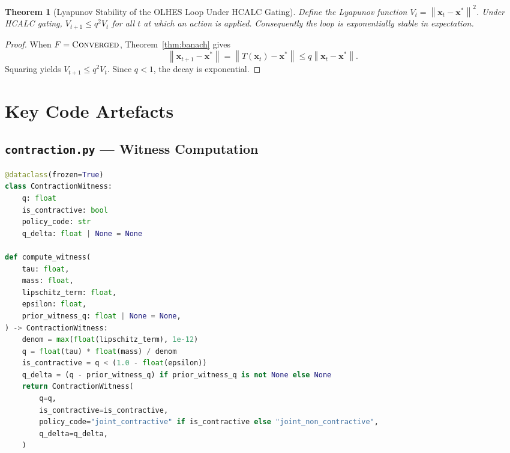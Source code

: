 \documentclass[11pt,a4paper]{article}
\theoremstyle{tealstyle}
\newtheorem{theorem}{Theorem}[section]
\theoremstyle{definition}
\newcommand{\norm}[1]{\left\lVert #1 \right\rVert}
\newcommand{\qwit}{q}
\newcommand{\F}{F}
\newcommand{\converged}{\textsc{Converged}}
\begin{document}
\begin{theorem}[Lyapunov Stability of the OLHES Loop Under HCALC Gating]
\label{thm:lyapunov}
Define the Lyapunov function $V_t = \norm{\bm{x}_t - \bm{x}^*}^2$.
Under HCALC gating, $V_{t+1} \le \qwit^2 V_t$ for all $t$ at which an
action is applied.
Consequently the loop is exponentially stable in expectation.
\end{theorem}

\begin{proof}
When $\F = \converged$, Theorem~\ref{thm:banach} gives
\[
\norm{\bm{x}_{t+1} - \bm{x}^*}
 = \norm{T(\bm{x}_t) - \bm{x}^*}
 \le \qwit \norm{\bm{x}_t - \bm{x}^*}.
\]
Squaring yields $V_{t+1} \le \qwit^2 V_t$.
Since $\qwit < 1$, the decay is exponential.
\end{proof}

\appendix
\section{Key Code Artefacts}
\label{app:code}

\subsection{\texttt{contraction.py} — Witness Computation}
\begin{lstlisting}[language=Python, caption={Contraction witness with temporal chaining.}]
@dataclass(frozen=True)
class ContractionWitness:
    q: float
    is_contractive: bool
    policy_code: str
    q_delta: float | None = None

def compute_witness(
    tau: float,
    mass: float,
    lipschitz_term: float,
    epsilon: float,
    prior_witness_q: float | None = None,
) -> ContractionWitness:
    denom = max(float(lipschitz_term), 1e-12)
    q = float(tau) * float(mass) / denom
    is_contractive = q < (1.0 - float(epsilon))
    q_delta = (q - prior_witness_q) if prior_witness_q is not None else None
    return ContractionWitness(
        q=q,
        is_contractive=is_contractive,
        policy_code="joint_contractive" if is_contractive else "joint_non_contractive",
        q_delta=q_delta,
    )
\end{lstlisting}
\end{document}
